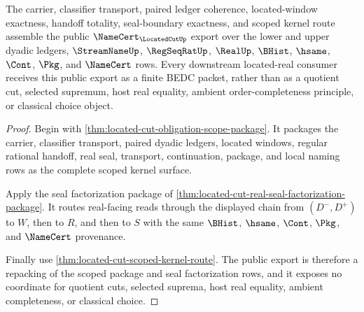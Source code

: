 \begin{theorem}
\label{thm:located-cut-public-namecert-export}
The carrier, classifier transport, paired ledger coherence, located-window exactness, handoff totality, seal-boundary exactness, and scoped kernel route assemble the public $\NameCert_{\LocatedCutUp}$ export over the lower and upper dyadic ledgers, $\StreamNameUp$, $\RegSeqRatUp$, $\RealUp$, $\BHist$, $\hsame$, $\Cont$, $\Pkg$, and $\NameCert$ rows. Every downstream located-real consumer receives this public export as a finite BEDC packet, rather than as a quotient cut, selected supremum, host real equality, ambient order-completeness principle, or classical choice object.
\end{theorem}
\begin{proof}
Begin with \autoref{thm:located-cut-obligation-scope-package}. It packages the carrier, classifier transport, paired dyadic ledgers, located windows, regular rational handoff, real seal, transport, continuation, package, and local naming rows as the complete scoped kernel surface.

Apply the seal factorization package of \autoref{thm:located-cut-real-seal-factorization-package}. It routes real-facing reads through the displayed chain from $(D^{-},D^{+})$ to $W$, then to $R$, and then to $S$ with the same $\BHist$, $\hsame$, $\Cont$, $\Pkg$, and $\NameCert$ provenance.

Finally use \autoref{thm:located-cut-scoped-kernel-route}. The public export is therefore a repacking of the scoped package and seal factorization rows, and it exposes no coordinate for quotient cuts, selected suprema, host real equality, ambient completeness, or classical choice.
\end{proof}

